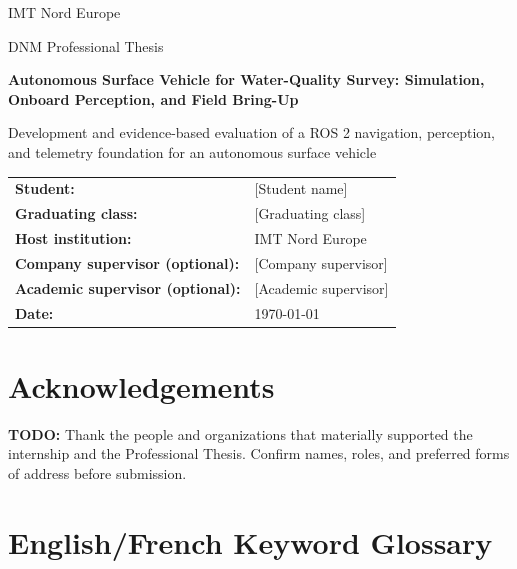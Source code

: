 \documentclass[a4paper,12pt,oneside,openany]{report}
\newcommand{\ReportTodo}[1]{\textbf{TODO:} #1}
\newcommand{\StudentName}{[Student name]}
\newcommand{\GraduatingClass}{[Graduating class]}
\newcommand{\CompanyName}{IMT Nord Europe}
\newcommand{\ThesisType}{DNM Professional Thesis}
\newcommand{\ReportTitle}{Autonomous Surface Vehicle for Water-Quality Survey:
  Simulation, Onboard Perception, and Field Bring-Up}
\newcommand{\SubjectOverview}{Development and evidence-based evaluation of a ROS 2 navigation,
  perception, and telemetry foundation for an autonomous surface vehicle}
\newcommand{\InstitutionName}{IMT Nord Europe}
\newcommand{\CompanySupervisor}{[Company supervisor]}
\newcommand{\AcademicSupervisor}{[Academic supervisor]}
\newcommand{\ReportDate}{\today}
\newif\ifreportconfidential
\begin{document}

\begin{titlepage}
  \centering
  {\Large \InstitutionName\par}
  \vspace{1.5cm}
  {\large \ThesisType\par}
  \vspace{1cm}
  {\Huge\bfseries \ReportTitle\par}
  \vspace{0.8cm}
  {\Large \SubjectOverview\par}
  \vfill

  \begin{tabular}{@{}ll@{}}
    \textbf{Student:} & \StudentName \\
    \textbf{Graduating class:} & \GraduatingClass \\
    \textbf{Host institution:} & \CompanyName \\
    \textbf{Company supervisor (optional):} & \CompanySupervisor \\
    \textbf{Academic supervisor (optional):} & \AcademicSupervisor \\
    \textbf{Date:} & \ReportDate
  \end{tabular}

  \ifreportconfidential
    \vfill
    {\Large\bfseries CONFIDENTIAL\par}
  \fi
\end{titlepage}

\clearpage
{}

\chapter*{Acknowledgements}

\ReportTodo{Thank the people and organizations that materially supported the internship and
the Professional Thesis. Confirm names, roles, and preferred forms of address before
submission.}

\tableofcontents
\listoffigures
\listoftables

\chapter*{English/French Keyword Glossary}
\end{document}
